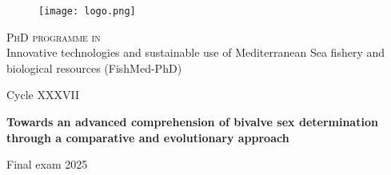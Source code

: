 \documentclass[main.tex]{subfiles}
\begin{document}
\begin{titlepage}
%
%
%
%
\begin{center}

\begin{figure}[h]
    \centering
    \texttt{[image: logo.png]}
    \label{fig:logo}
\end{figure}

{{\Large{\textsc{PhD programme in}} \\
Innovative technologies and sustainable use of Mediterranean Sea fishery and biological resources (FishMed-PhD)}} 
\vspace{5mm}

{\large{Cycle XXXVII}}
\vspace{5mm}
\end{center}

{}

\vspace{15mm}

\begin{center} {

{\LARGE{\bf Towards an advanced comprehension of bivalve sex determination through a comparative and evolutionary approach}}\\

}\end{center}

\vspace{15mm} \par \noindent


\vspace{5mm} \par \noindent


\vspace{15mm}

\vfill

\begin{center}
Final exam 2025
\end{center}

\end{titlepage}
\end{document}
